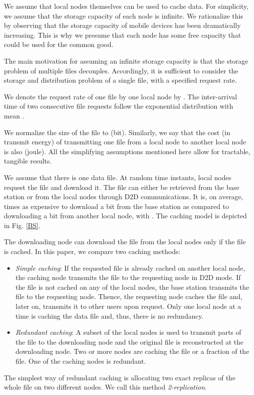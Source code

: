 \documentclass[10pt,conference]{IEEEtran}
\begin{document}
We assume that local nodes themselves can be used to cache
data. For simplicity, we assume that the storage capacity of each node
is infinite. We rationalize this by observing that the storage capacity of mobile devices has been dramatically increasing. This is why we presume that each node has some free
capacity that could be used for the common good.

The main motivation for assuming an infinite
storage capacity is that the storage problem of multiple files
decouples. Accordingly, it is sufficient to consider the storage
and distribution problem of a single file, with a specified request rate.

We denote the request rate of one file by one local node by . The
inter-arrival time of two consecutive file requests follow the
exponential distribution with mean .

We normalize the size of the file to  (bit). Similarly, we say that the cost (in
transmit energy) of transmitting one file from a local node to
another local node is also  (joule). All the simplifying
assumptions mentioned here allow for tractable, tangible results.

We assume that there is one data file. At random time instants, local nodes request the file and download it. The file can either be retrieved from the base station or from the
local nodes through D2D communications. It is, on average,  times as
expensive to download a bit from the base station as compared to
downloading a bit from another local node, with . The caching
model is depicted in Fig. \ref{BS}. 

The downloading node can download the file from the local nodes only
if the file is cached. In this paper, we compare two caching methods:
\begin{itemize}
\item \emph{Simple caching}: If the requested file is already cached on another local node, the caching node transmits the file to the requesting node in D2D mode. If the file is not cached on any of the local nodes, the base station transmits the file to the requesting node. Thence, the requesting node caches the file and, later on, transmits it to other users upon request. Only one local node at a time is caching the data file and, thus, there is no redundancy.
\item \emph{Redundant caching}: A subset of the local nodes is used to transmit parts of the file to the downloading node and the original file is reconstructed at the downloading node. Two or more nodes are caching the file or a fraction of the file. One of the caching nodes is redundant.
\end{itemize}
The simplest way of redundant caching is allocating two exact replicas
of the whole file on two different nodes. We call this method
\emph{2-replication}.
\end{document}
